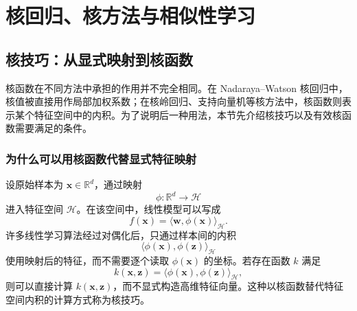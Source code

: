 \documentclass[UTF8,zihao=-4,openany]{ctexbook}
\begin{document}
\setcounter{chapter}{9}
\chapter{核回归、核方法与相似性学习}
\setcounter{section}{4}


\section{核技巧：从显式映射到核函数}

核函数在不同方法中承担的作用并不完全相同。在 Nadaraya--Watson 核回归中，核值被直接用作局部加权系数；在核岭回归、支持向量机等核方法中，核函数则表示某个特征空间中的内积。为了说明后一种用法，本节先介绍核技巧以及有效核函数需要满足的条件。

\subsection{为什么可以用核函数代替显式特征映射}

设原始样本为 $\boldsymbol{x}\in\mathbb{R}^{d}$，通过映射
\[
  \phi:\mathbb{R}^{d}\rightarrow\mathcal{H}
\]
进入特征空间 $\mathcal{H}$。在该空间中，线性模型可以写成
\[
  f(\boldsymbol{x})
  =
  \langle \boldsymbol{w},\phi(\boldsymbol{x})\rangle_{\mathcal H}.
\]
许多线性学习算法经过对偶化后，只通过样本间的内积
\[
  \langle\phi(\boldsymbol{x}),\phi(\boldsymbol{z})\rangle_{\mathcal H}
\]
使用映射后的特征，而不需要逐个读取 $\phi(\boldsymbol{x})$ 的坐标。若存在函数 $k$ 满足
\begin{equation}
  k(\boldsymbol{x},\boldsymbol{z})
  =
  \langle\phi(\boldsymbol{x}),\phi(\boldsymbol{z})\rangle_{\mathcal H},
  \label{eq:kernel-inner-product}
\end{equation}
则可以直接计算 $k(\boldsymbol{x},\boldsymbol{z})$，而不显式构造高维特征向量。这种以核函数替代特征空间内积的计算方式称为核技巧。
\end{document}
